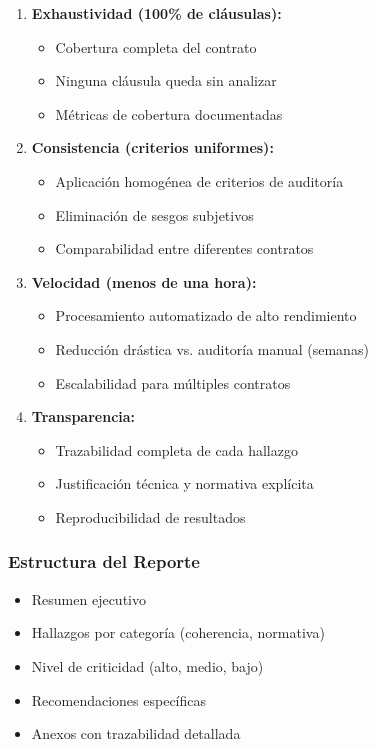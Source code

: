 \documentclass[12pt,a4paper]{article}
\begin{document}
\begin{enumerate}[leftmargin=*]
    \item \textbf{Exhaustividad (100\% de cláusulas):}
    \begin{itemize}
        \item Cobertura completa del contrato
        \item Ninguna cláusula queda sin analizar
        \item Métricas de cobertura documentadas
    \end{itemize}
    
    \item \textbf{Consistencia (criterios uniformes):}
    \begin{itemize}
        \item Aplicación homogénea de criterios de auditoría
        \item Eliminación de sesgos subjetivos
        \item Comparabilidad entre diferentes contratos
    \end{itemize}
    
    \item \textbf{Velocidad (menos de una hora):}
    \begin{itemize}
        \item Procesamiento automatizado de alto rendimiento
        \item Reducción drástica vs. auditoría manual (semanas)
        \item Escalabilidad para múltiples contratos
    \end{itemize}
    
    \item \textbf{Transparencia:}
    \begin{itemize}
        \item Trazabilidad completa de cada hallazgo
        \item Justificación técnica y normativa explícita
        \item Reproducibilidad de resultados
    \end{itemize}
\end{enumerate}

\subsubsection{Estructura del Reporte}

\begin{itemize}[leftmargin=*]
    \item Resumen ejecutivo
    \item Hallazgos por categoría (coherencia, normativa)
    \item Nivel de criticidad (alto, medio, bajo)
    \item Recomendaciones específicas
    \item Anexos con trazabilidad detallada
\end{itemize}
\end{document}
